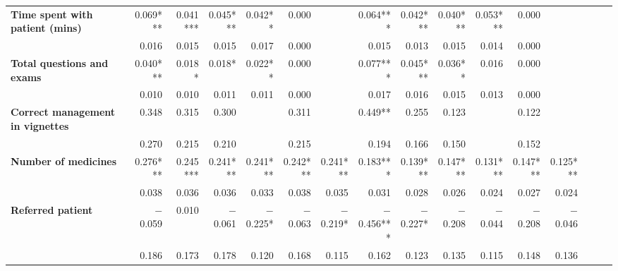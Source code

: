 \begin{tabular}{@{\extracolsep{5pt}}lrrrrrrrrrrrrrrr}
{\bf Time spent with patient (mins)} & 0.069*** & 0.041*** & 0.045*** & 0.042**\phantom{*} & 0.000\phantom{***} & \phantom{***} & 0.064*** & 0.042*** & 0.040*** & 0.053*** & 0.000\phantom{***} & \phantom{***} \\
{\bf } & 0.016\phantom{***} & 0.015\phantom{***} & 0.015\phantom{***} & 0.017\phantom{***} & 0.000\phantom{***} & \phantom{***} & 0.015\phantom{***} & 0.013\phantom{***} & 0.015\phantom{***} & 0.014\phantom{***} & 0.000\phantom{***} & \phantom{***} \\
{\bf Total questions and exams} & 0.040*** & 0.018*\phantom{**} & 0.018*\phantom{**} & 0.022**\phantom{*} & 0.000\phantom{***} & \phantom{***} & 0.077*** & 0.045*** & 0.036**\phantom{*} & 0.016\phantom{***} & 0.000\phantom{***} & \phantom{***} \\
{\bf } & 0.010\phantom{***} & 0.010\phantom{***} & 0.011\phantom{***} & 0.011\phantom{***} & 0.000\phantom{***} & \phantom{***} & 0.017\phantom{***} & 0.016\phantom{***} & 0.015\phantom{***} & 0.013\phantom{***} & 0.000\phantom{***} & \phantom{***} \\
{\bf Correct management in vignettes} & 0.348\phantom{***} & 0.315\phantom{***} & 0.300\phantom{***} & \phantom{***} & 0.311\phantom{***} & \phantom{***} & 0.449**\phantom{*} & 0.255\phantom{***} & 0.123\phantom{***} & \phantom{***} & 0.122\phantom{***} & \phantom{***} \\
{\bf } & 0.270\phantom{***} & 0.215\phantom{***} & 0.210\phantom{***} & \phantom{***} & 0.215\phantom{***} & \phantom{***} & 0.194\phantom{***} & 0.166\phantom{***} & 0.150\phantom{***} & \phantom{***} & 0.152\phantom{***} & \phantom{***} \\
{\bf Number of medicines} & 0.276*** & 0.245*** & 0.241*** & 0.241*** & 0.242*** & 0.241*** & 0.183*** & 0.139*** & 0.147*** & 0.131*** & 0.147*** & 0.125*** \\
{\bf } & 0.038\phantom{***} & 0.036\phantom{***} & 0.036\phantom{***} & 0.033\phantom{***} & 0.038\phantom{***} & 0.035\phantom{***} & 0.031\phantom{***} & 0.028\phantom{***} & 0.026\phantom{***} & 0.024\phantom{***} & 0.027\phantom{***} & 0.024\phantom{***} \\
{\bf Referred patient} & $-$0.059\phantom{***} & 0.010\phantom{***} & $-$0.061\phantom{***} & $-$0.225*\phantom{**} & $-$0.063\phantom{***} & $-$0.219*\phantom{**} & $-$0.456*** & $-$0.227*\phantom{**} & $-$0.208\phantom{***} & $-$0.044\phantom{***} & $-$0.208\phantom{***} & $-$0.046\phantom{***} \\
{\bf } & 0.186\phantom{***} & 0.173\phantom{***} & 0.178\phantom{***} & 0.120\phantom{***} & 0.168\phantom{***} & 0.115\phantom{***} & 0.162\phantom{***} & 0.123\phantom{***} & 0.135\phantom{***} & 0.115\phantom{***} & 0.148\phantom{***} & 0.136\phantom{***} \\

\end{tabular}
